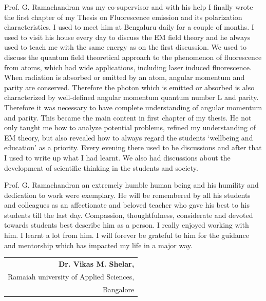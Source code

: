 \medskip

 Prof. G. Ramachandran was my co-supervisor and with his help I finally wrote the first chapter of my Thesis on Fluorescence emission and its polarization characteristics. I used to meet him at Bengaluru daily for a couple of months. I used to visit his house every day to discuss the EM field theory and he always used to teach me  with the same energy as on the first discussion. We used to discuss the quantum field theoretical approach to the phenomenon of fluorescence from atoms, which had wide applications, including laser induced fluorescence. When radiation is absorbed or emitted by an atom, angular momentum and parity are conserved. Therefore the photon which is emitted or absorbed is also characterized by well-defined angular momentum quantum number L and parity. Therefore it was necessary to have complete understanding of angular momentum and parity. This became the main content in first chapter of my thesis. He not only taught me how to analyze potential problems, refined my understanding of EM theory, but also revealed how to always regard the students `wellbeing and education' as a priority. Every evening there used to be discussions and after that I used to write up what I had learnt. We also had discussions about the development of scientific thinking in the students and society.

\medskip

Prof. G. Ramachandran an extremely humble human being and his humility and dedication to work were exemplary. He will be remembered by all his students and colleagues as an affectionate and beloved teacher who gave his best to his students till the last day. Compassion, thoughtfulness, considerate and devoted towards students best describe him as a person. I really enjoyed working with him. I learnt a lot from him. I will forever be grateful to him for the guidance and mentorship which has impacted my life in a major way.

\begin{flushright}
\begin{tabular}{r@{}}
\textbf{Dr. Vikas M. Shelar,}\\
Ramaiah university of Applied Sciences,\\
Bangalore
\end{tabular}
\end{flushright}\relax


\medskip
\medskip


